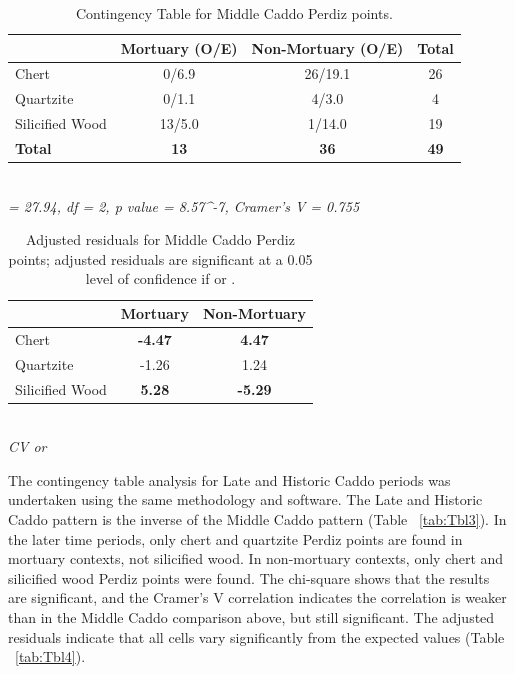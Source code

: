 \documentclass[review]{elsarticle}
\begin{document}
\begin{table}[tbh]\centering
\footnotesize
\caption{Contingency Table for Middle Caddo Perdiz points.}
\centering
\begin{tabular}{lccc}
\hline
 & Mortuary (O/E) & Non-Mortuary (O/E) & Total\\
\hline
Chert & 0/6.9 & 26/19.1 & 26\\
Quartzite & 0/1.1 & 4/3.0 & 4\\
Silicified Wood & 13/5.0 & 1/14.0 & 19\\
\hline
\textbf{Total} & \textbf{13} & \textbf{36} & \textbf{49}\\
\hline
\end{tabular}\\
\textit{ = 27.94, df = 2, p value = 8.57^{-7}, Cramer’s V = 0.755}
\label{tab:Tbl1}
\end{table}

\begin{table}[tbh]\centering
\footnotesize
\caption{Adjusted residuals for Middle Caddo Perdiz points; adjusted residuals are significant at a 0.05 level of confidence if \textbf{} or \textbf{}.}
\centering
\begin{tabular}{lcc}
\hline
 & Mortuary & Non-Mortuary\\
\hline
Chert & \textbf{-4.47} & \textbf{4.47}\\
Quartzite & -1.26 & 1.24\\
Silicified Wood & \textbf{5.28} & \textbf{-5.29}\\
\hline
\end{tabular}\\
\textit{CV  or }
\label{tab:Tbl2}
\end{table}

The contingency table analysis for Late and Historic Caddo periods was undertaken using the same methodology and software. The Late and Historic Caddo pattern is the inverse of the Middle Caddo pattern (Table ~\ref{tab:Tbl3}). In the later time periods, only chert and quartzite Perdiz points are found in mortuary contexts, not silicified wood. In non-mortuary contexts, only chert and silicified wood Perdiz points were found. The chi-square shows that the results are significant, and the Cramer’s V correlation indicates the correlation is weaker than in the Middle Caddo comparison above, but still significant. The adjusted residuals indicate that all cells vary significantly from the expected values (Table ~\ref{tab:Tbl4}).
\end{document}
